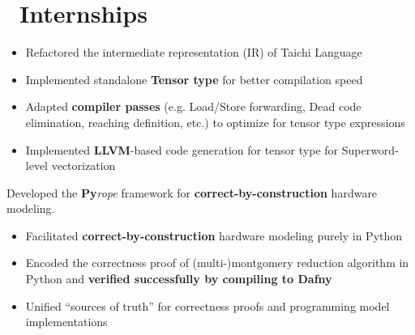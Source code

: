 \documentclass{resume}
\begin{document}
\section{\faCode\ Internships}
\begin{itemize}
    \item Refactored the intermediate representation (IR) of Taichi Language
    \item Implemented standalone \textbf{Tensor type} for better compilation speed
    \item Adapted \textbf{compiler passes} (e.g. Load/Store forwarding, Dead code elimination, reaching definition, etc.) to optimize for tensor type expressions
    \item Implemented \textbf{LLVM}-based code generation for tensor type for Superword-level vectorization
\end{itemize}

Developed the \textbf{Py}\textit{rope} framework for \textbf{correct-by-construction} hardware modeling.
\begin{itemize}
  \item Facilitated \textbf{correct-by-construction} hardware modeling purely in Python
  \item Encoded the correctness proof of (multi-)montgomery reduction algorithm in Python and \textbf{verified successfully by compiling to Dafny}
  \item Unified ``sources of truth'' for correctness proofs and programming model implementations
\end{itemize}
\end{document}
